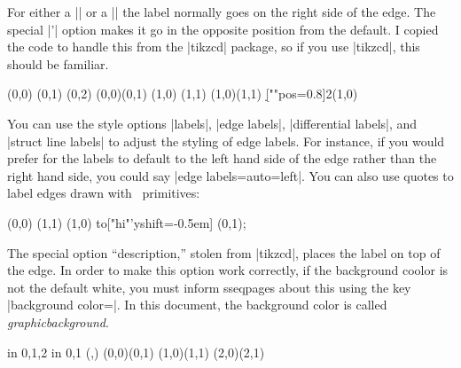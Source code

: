 \documentclass{ltxdoc}
\newenvironment{manualentry}[1]{
    \begin{pgfmanualentry}
    \pgfmanualentryheadline{#1}
    \pgfmanualbody
}{
    \end{pgfmanualentry}
}
\begin{document}
\begin{sseqdata}[name=ex1,degree={#1}{1-#1}]
\begin{manualentry}{\pgfmanualpdflabel{""quotes}{}|"|\meta{text}|"|\opt{\meta{options}}}
For either a |\structline| or a |\class| the label normally goes on the right side of the edge. The special |'| option makes it go in the opposite position from the default. I copied the code to handle this from the |tikzcd| package, so if you use |tikzcd|, this should be familiar.
\begin{codeexample}[width=6cm]
\begin{sseqpage}
\class(0,0)
\class(0,1)
\class(0,2)
\structline["a"' blue](0,0)(0,1)
\class(1,0)
\class(1,1)
\structline["b"](1,0)(1,1)
\d[""{pos=0.8}]2(1,0)
\end{sseqpage}
\end{codeexample}
You can use the style options |labels|, |edge labels|, |differential labels|, and |struct line labels| to adjust the styling of edge labels. For instance, if you would prefer for the labels to default to the left hand side of the edge rather than the right hand side, you could say |edge labels={auto=left}|.
You can also use quotes to label edges drawn with \tikzname\ primitives:
\begin{codeexample}[width=6cm]
\begin{sseqpage}
\class(0,0) \class(1,1)
\draw (1,0) to["hi"'{yshift=-0.5em}] (0,1);
\end{sseqpage}
\end{codeexample}
The special option ``description,'' stolen from |tikzcd|, places the label on top of the edge. In order to make this option work correctly, if the background coolor is not the default white, you must inform sseqpages about this using the key |background color=|. In this document, the background color is called \textit{graphicbackground}.
\begin{codeexample}[width=6cm]
\begin{sseqpage}[no axes,background color=graphicbackground]
\foreach\x in {0,1,2} \foreach\y in {0,1}{
    \class(\x,\y)
}
\structline["a" red](0,0)(0,1)
\structline["a'"'blue,"b"{yshift=1em}](1,0)(1,1)
\structline["c" description](2,0)(2,1)
\end{sseqpage}
\end{codeexample}
\end{manualentry}




\end{sseqdata}
\end{document}
